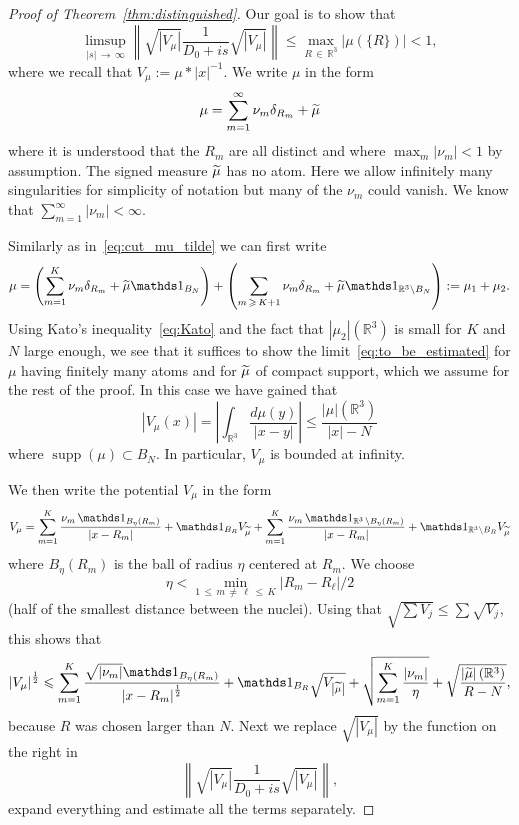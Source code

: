 \documentclass[10pt]{amsart}
\theoremstyle{definition}
\newcommand{\R}{\mathbb{R}}
\DeclareMathOperator{\supp}{supp}
\newcommand\1{{\ensuremath {\mathds 1} }}
\newcommand{\ii}{\infty}
\newcommand{\norm}[1]{ \left\| #1 \right\|}
\renewcommand{\geq}{\geqslant}
\renewcommand{\leq}{\leqslant}
\renewcommand{\tilde}{\widetilde}
\let\oldtilde\tilde
\renewcommand*{\tilde}[1]{\mathchoice{\widetilde{#1}}{\widetilde{#1}}{\oldtilde{#1}}{\oldtilde{#1}}}
\begin{document}
\begin{proof}[Proof of Theorem~\ref{thm:distinguished}]
Our goal is to show that
\begin{equation}\label{eq:to_be_estimated}
\limsup_{|s|\,\to\,\ii} \norm{\sqrt{\left|V_\mu\right|}\frac{1}{D_0+is}\sqrt{\left|V_\mu\right|}}\leq \max_{R\,\in\,\R^3}\left|\mu(\{R\})\right|<1,
\end{equation}
where we recall that $V_\mu:=\mu\ast|x|^{-1}$. We write $\mu$ in the form
\[
\mu=\sum_{m=1}^\ii\nu_m\delta_{R_m}+\tilde\mu
\]
where it is understood that the $R_m$ are all distinct and where $\max_m|\nu_m|<1$ by assumption. The signed measure $\tilde\mu$ has no atom. Here we allow infinitely many singularities for simplicity of notation but many of the $\nu_m$ could vanish. We know that $\sum_{m=1}^\ii|\nu_m|<\ii$.

\vspace{3pt}
Similarly as in~\eqref{eq:cut_mu_tilde} we can first write
\begin{equation}\label{eq:decompose_mu}
\mu=\left(\sum_{m=1}^K\nu_m\delta_{R_m}+\tilde\mu\1_{B_N}\right)+\left(\sum_{m\,\geq\,K+1}\nu_m\delta_{R_m}+\tilde\mu\1_{\R^3\setminus B_N}\right):=\mu_1+\mu_2.
\end{equation}
Using Kato's inequality~\eqref{eq:Kato} and the fact that $|\mu_2|(\R^3)$ is small for $K$ and $N$ large enough, we see that it suffices to show the limit~\eqref{eq:to_be_estimated} for $\mu$ having finitely many atoms and for $\tilde\mu$ of compact support, which we assume for the rest of the proof. In this case we have gained that
\[
\left|V_{\mu}(x)\right|=\left|\int_{\R^3}\frac{d\mu(y)}{\left|x-y\right|}\right|\leq \frac{|\mu|\left(\R^3\right)}{|x|-N}
\]
where ${\supp}(\mu)\subset B_N$. In particular, $V_\mu$ is bounded at infinity.

We then write the potential $V_\mu$ in the form
\[
V_\mu=\sum_{m=1}^K\frac{\nu_m\,\1_{B_\eta(R_m)}}{|x-R_m|}+\1_{B_R}V_{\tilde\mu}+\sum_{m=1}^K\frac{\nu_m\,\1_{\R^3\,\setminus B_\eta(R_m)}}{|x-R_m|}+\1_{\R^3\setminus B_R}V_{\tilde\mu}
\]
where $B_\eta(R_m)$ is the ball of radius $\eta$ centered at $R_m$. We choose
\[
\eta<\min_{1\,\leq\,m\,\neq\,\ell\,\leq\,K}\left|R_m-R_\ell\right|/2
\]
(half of the smallest distance between the nuclei). Using that $\sqrt{\sum V_j}\leq \sum\sqrt{V_j}$, this shows that
\begin{equation}\label{eq:decomp_sqrt_V_mu}
\left|V_\mu\right|^{\frac12}\leq \sum_{m=1}^K\frac{\sqrt{|\nu_m|}\1_{B_\eta(R_m)}}{\left|x-R_m\right|^{\frac12}}+\1_{B_R}\sqrt{V_{\left|\tilde\mu\right|}}+\sqrt{\sum_{m=1}^K\frac{\left|\nu_m\right|}{\eta}}+\sqrt{\frac{\left|\tilde\mu\right|\left(\R^3\right)}{R-N}},
\end{equation}
because $R$ was chosen larger than $N$. Next we replace $\sqrt{|V_\mu|}$ by the function on the right in
\[
\norm{\sqrt{\left|V_\mu\right|}\frac{1}{D_0+is}\sqrt{\left|V_\mu\right|}},
\]
expand everything and estimate all the terms separately.


\end{proof}
\end{document}
